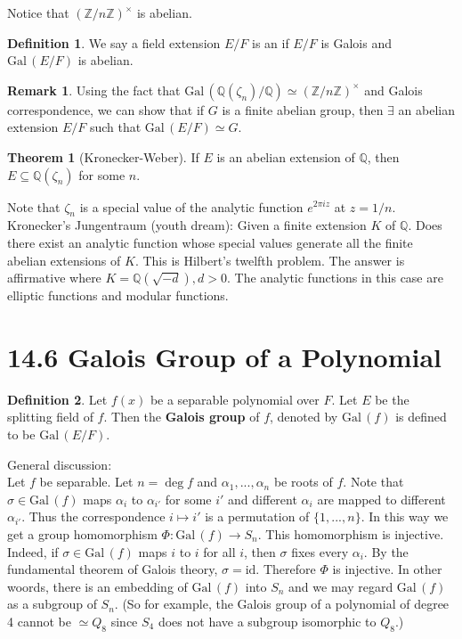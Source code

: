 \documentclass{article}
\theoremstyle{definition}
\newtheorem{thm}{Theorem}
\newtheorem{dfn}{Definition}
\newtheorem{rem}{Remark}
\newcommand{\QQ}{\mathbb Q}
\newcommand{\ZZ}{\mathbb Z}
\newcommand{\Gal}{\text{Gal}\,}
\begin{document}
Notice that $(\ZZ/n \ZZ)^\times$ is abelian.

\begin{dfn}
	We say a field extension $E/F$ is an  if $E/F$ is Galois and $\Gal(E/F)$ is abelian.
\end{dfn}

\begin{rem}
	Using the fact that $\Gal(\QQ(\zeta_n)/\QQ) \simeq (\ZZ/n \ZZ)^\times$ and Galois correspondence, we can show that if $G$ is a finite abelian group, then $\exists$ an abelian extension $E/F$ such that $\Gal(E/F) \simeq G$.

	\begin{thm}[Kronecker-Weber]
		If $E$ is an abelian extension of $\QQ$, then $E \subseteq \QQ(\zeta_n)$ for some $n$.
	\end{thm}

	Note that $\zeta_n$ is a special value of the analytic function $e^{2 \pi i z}$ at $z = 1/n$.
	Kronecker's Jungentraum (youth dream): 
	Given a finite extension $K$ of $\QQ$.
	Does there exist an analytic function whose special values generate all the finite abelian extensions of $K$.
	This is Hilbert's twelfth problem.
	The answer is affirmative where $K = \QQ(\sqrt{-d}), d > 0$.
	The analytic functions in this case are elliptic functions and modular functions.

\end{rem}

\section*{14.6 Galois Group of a Polynomial}

\begin{dfn}
	Let $f(x)$ be a separable polynomial over $F$.
	Let $E$ be the splitting field of $f$.
	Then the \textbf{Galois group} of $f$, denoted by $\Gal(f)$ is defined to be $\Gal(E/F)$. 
\end{dfn}

General discussion:\\
Let $f$ be separable.
Let $n = \deg f$ and $\alpha_1, ..., \alpha_n$ be roots of $f$.
Note that $\sigma \in \Gal(f)$ maps $\alpha_i$ to $\alpha_{i'}$ for some $i'$ and different $\alpha_i$ are mapped to different $\alpha_{i'}$.
Thus the correspondence $i \mapsto i'$ is a permutation of $\{1, ..., n\}$.
In this way we get a group homomorphism $\Phi: \Gal(f)\to S_n$.
This homomorphism is injective. 
Indeed, if $\sigma \in \Gal(f)$ maps $i$ to $i$ for all $i$, then $\sigma$ fixes every $\alpha_i$.
By the fundamental theorem of Galois theory, $\sigma = \text{id}$.
Therefore $\Phi$ is injective.
In other woords, there is an embedding of $\Gal(f)$ into $S_n$ and we may regard $\Gal(f)$ as a subgroup of $S_n$.
(So for example, the Galois group of a polynomial of degree 4 cannot be $\simeq Q_8$ since $S_4$ does not have a subgroup isomorphic to $Q_8$.)
\end{document}
